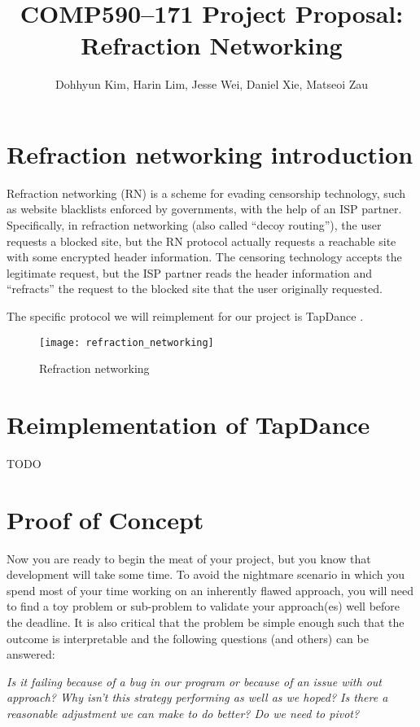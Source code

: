 \documentclass{article}
\title{COMP590--171 Project Proposal: Refraction Networking}
\author{Dohhyun Kim, Harin Lim, Jesse Wei, Daniel Xie, Matseoi Zau}
\begin{document}
\maketitle

\section{Refraction networking introduction}

Refraction networking (RN) is a scheme for evading censorship technology, such as website blacklists enforced by governments, with the help of an ISP partner. Specifically, in refraction networking (also called ``decoy routing''), the user requests a blocked site, but the RN protocol actually requests a reachable site with some encrypted header information. The censoring technology accepts the legitimate request, but the ISP partner reads the header information and ``refracts'' the request to the blocked site that the user originally requested.

The specific protocol we will reimplement for our project is TapDance \cite{tapdance}.

\begin{figure}[h]
    \centering
    \texttt{[image: refraction\_networking]}
    \caption{Refraction networking \cite{refraction_network}}
\end{figure}

\section{Reimplementation of TapDance}

TODO

\section{Proof of Concept}
Now you are ready to begin the meat of your project, but you know that development will take some time. To avoid the nightmare scenario in which you spend most of your time working on an inherently flawed approach, you will need to find a toy problem or sub-problem to validate your approach(es) well before the deadline. It is also critical that the problem be simple enough such that the outcome is interpretable and the following questions (and others) can be answered:

\textit{Is it failing because of a bug in our program or because of an issue with out approach? Why isn't this strategy performing as well as we hoped? Is there a reasonable adjustment we can make to do better? Do we need to pivot?}
\end{document}
